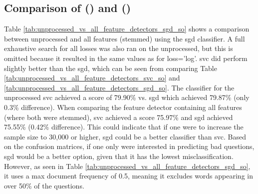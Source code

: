\subsection[Comparison of SVC and SGD]{Comparison of  () and  ()}
\label{sec:comparing_svc_sgd}
Table \ref{tab:unprocessed_vs_all_feature_detectors_sgd_so} shows a comparison between unprocessed and all features (stemmed) using the \gls{sgd} classifier.
A full exhaustive search for all losses was also ran on the unprocessed, but this is omitted because it resulted in the same values as for loss='log'.
\vspace{0.5em}\newline
\gls{svc} did perform slightly better than the \gls{sgd}, which can be seen from comparing Table \ref{tab:unprocessed_vs_all_feature_detectors_svc_so} and \ref{tab:unprocessed_vs_all_feature_detectors_sgd_so}.
The classifier for the unprocessed \gls{svc} achieved a score of 79.90\% vs. \gls{sgd} which achieved 79.87\% (only 0.3\% difference).
When comparing the feature detector containing all features (where both were stemmed), \gls{svc} achieved a score 75.97\% and \gls{sgd} achieved 75.55\% (0.42\% difference). 
This could indicate that if one were to increase the sample size to 30,000 or higher, \gls{sgd} could be a better classifier than \gls{svc}.
\clearpage\noindent
Based on the confusion matrices, if one only were interested in predicting bad questions, \gls{sgd} would be a better option, given that it has the lowest misclassification.
However, as seen in Table \ref{tab:unprocessed_vs_all_feature_detectors_sgd_so}, it uses a max document frequency of 0.5, meaning it excludes words appearing in over 50\% of the questions.

